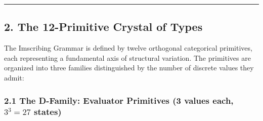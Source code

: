 \documentclass[12pt,a4paper]{article}
\begin{document}
\begin{center}\rule{0.5\linewidth}{0.5pt}\end{center}

\hypertarget{the-12-primitive-crystal-of-types}{%
\subsection{2. The 12-Primitive Crystal of
Types}\label{the-12-primitive-crystal-of-types}}

The Imscribing Grammar is defined by twelve orthogonal categorical
primitives, each representing a fundamental axis of structural
variation. The primitives are organized into three families
distinguished by the number of discrete values they admit:

\hypertarget{the-d-family-evaluator-primitives-3-values-each-33-27-states}{%
\subsubsection{\texorpdfstring{2.1 The D-Family: Evaluator Primitives (3
values each, \(3^3 = 27\)
states)}{2.1 The D-Family: Evaluator Primitives (3 values each, 3\^{}3 = 27 states)}}\label{the-d-family-evaluator-primitives-3-values-each-33-27-states}}
\end{document}
